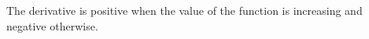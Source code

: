 \documentclass[12pt,letter]{article}
\begin{document}
The derivative is positive when the value of the function is increasing and negative otherwise. 
%
%
%
%
%
%
\end{document}
